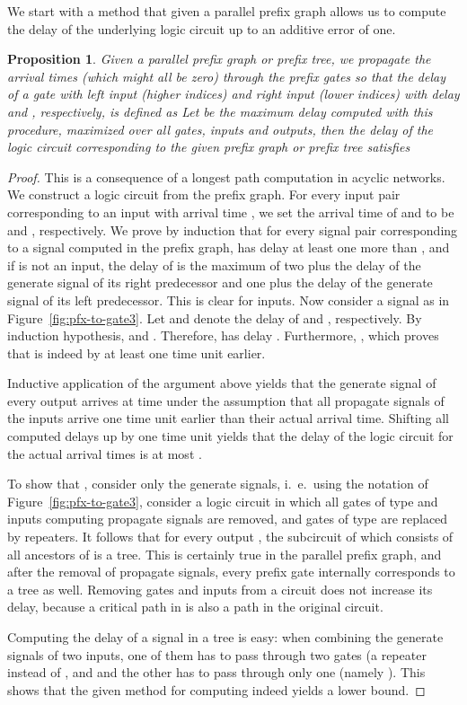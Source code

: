 \documentclass[11pt,final,microtype]{scrartcl}
\theoremstyle{plain}
\newtheorem{proposition}[theorem]{Proposition}
\theoremstyle{definition}
\theoremstyle{remark}
\begin{document}
We start with a method that given a parallel prefix graph allows us to
compute the delay of the underlying logic circuit up to an
additive error of one.

\begin{proposition} \label{lem:pfx-to-logic} Given a parallel prefix graph
  or prefix tree, we propagate the arrival times (which might all be
  zero) through the prefix gates so that the delay  of a gate with
  left input (higher indices)  and right input (lower indices) 
  with delay  and , respectively, is defined as  Let  be the maximum delay computed with
  this procedure, maximized over all gates, inputs and outputs, then
  the delay  of the logic circuit corresponding to the given prefix
  graph or prefix tree satisfies
  
\end{proposition}
\begin{proof}
  This is a  consequence of a longest path computation in acyclic networks.
  We construct a logic circuit from the prefix graph. For every input
  pair  corresponding to an input with arrival time , we
  set the arrival time of  and  to be  and ,
  respectively. We prove by induction that for every signal pair  corresponding to a signal  computed in the prefix graph, 
  has delay at least one more than , and if  is not an input,
  the delay of  is the maximum of two plus the delay of the
  generate signal of its right predecessor and one plus the delay of
  the generate signal of its left predecessor. This is clear for
  inputs. Now consider a signal  as in
  Figure~\ref{fig:pfx-to-gate3}. Let  and
   denote the delay of  and ,
  respectively. By induction hypothesis, 
  and . Therefore,  has delay . Furthermore, , which proves that 
  is indeed by at least one time unit earlier. 

  Inductive application of the argument above yields that the generate
  signal of every output arrives at time  under the assumption
  that all propagate signals of the inputs arrive one time unit
  earlier than their actual arrival time. Shifting all computed delays
  up by one time unit yields that the delay of the logic circuit for
  the actual arrival times is at most .

  To show that , consider only the generate signals, i.\ e.\
  using the notation of Figure~\ref{fig:pfx-to-gate3}, consider a
  logic circuit  in which all gates of type  and inputs 
  computing propagate signals are removed, and gates of type  are
  replaced by repeaters. It follows that for every output , the
  subcircuit of  which consists of all ancestors of  is a
  tree. This is certainly true in the parallel prefix graph, and after
  the removal of propagate signals, every prefix gate internally
  corresponds to a tree as well. Removing gates and inputs from a
  circuit does not increase its delay, because a critical path in 
  is also a path in the original circuit.

  Computing the delay of a signal in a tree is easy: when combining
  the generate signals of two inputs, one of them has to pass through
  two gates (a repeater instead of , and  and the other has to
  pass through only one (namely ). This shows that the given method
  for computing  indeed yields a lower bound.
\end{proof}
\end{document}
